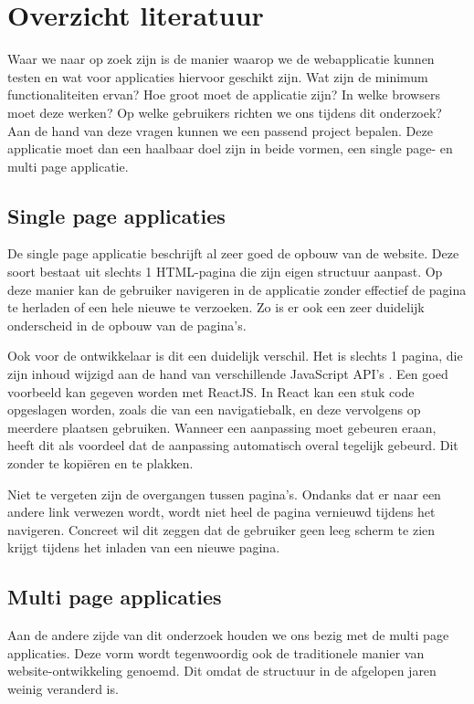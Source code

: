 \documentclass{hogent-article}
\begin{document}
\section{Overzicht literatuur}
Waar we naar op zoek zijn is de manier waarop we de webapplicatie kunnen testen en wat voor applicaties hiervoor geschikt zijn.
Wat zijn de minimum functionaliteiten ervan?
Hoe groot moet de applicatie zijn?
In welke browsers moet deze werken?
Op welke gebruikers richten we ons tijdens dit onderzoek?
Aan de hand van deze vragen kunnen we een passend project bepalen.
Deze applicatie moet dan een haalbaar doel zijn in beide vormen, een single page- en multi page applicatie.

\subsection{Single page applicaties}
De single page applicatie beschrijft al zeer goed de opbouw van de website.
Deze soort bestaat uit slechts 1 HTML-pagina die zijn eigen structuur aanpast.
Op deze manier kan de gebruiker navigeren in de applicatie zonder effectief de pagina te herladen of een hele nieuwe te verzoeken.
Zo is er ook een zeer duidelijk onderscheid in de opbouw van de pagina's.

Ook voor de ontwikkelaar is dit een duidelijk verschil.
Het is slechts 1 pagina, die zijn inhoud wijzigd aan de hand van verschillende JavaScript API's \autocite{MDN2022}.
Een goed voorbeeld kan gegeven worden met ReactJS.
In React kan een stuk code opgeslagen worden, zoals die van een navigatiebalk, en deze vervolgens op meerdere plaatsen gebruiken.
Wanneer een aanpassing moet gebeuren eraan, heeft dit als voordeel dat de aanpassing automatisch overal tegelijk gebeurd.
Dit zonder te kopiëren en te plakken.

Niet te vergeten zijn de overgangen tussen pagina's.
Ondanks dat er naar een andere link verwezen wordt, wordt niet heel de pagina vernieuwd tijdens het navigeren.
Concreet wil dit zeggen dat de gebruiker geen leeg scherm te zien krijgt tijdens het inladen van een nieuwe pagina.

\subsection{Multi page applicaties}
Aan de andere zijde van dit onderzoek houden we ons bezig met de multi page applicaties.
Deze vorm wordt tegenwoordig ook de traditionele manier van website-ontwikkeling genoemd.
Dit omdat de structuur in de afgelopen jaren weinig veranderd is.
\end{document}
